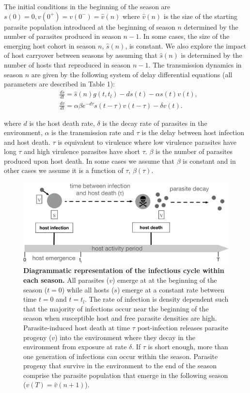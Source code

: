 \documentclass{article}
\begin{document}
The initial conditions in the beginning of the season are $s(0) = 0, v(0^+) = v(0^-) = \hat{v}(n)$ where $\hat{v}(n)$ is the size of the starting parasite population introduced at the beginning of season $n$ determined by the number of parasites produced in season $n-1$. In some cases, the size of the emerging host cohort in season $n$, $\hat{s}(n)$, is constant. We also explore the impact of host carryover between seasons by assuming that $\hat{s}(n)$ is determined by the number of hosts that reproduced in season $n-1$. The transmission dynamics in season $n$ are given by the following system of delay differential equations (all parameters are described in Table 1):
\begin{align*}
&\frac{ds}{dt} = \hat{s}(n)g(t,t_{l})-ds(t)- \alpha s(t)v(t),\tag{1a}\\
&\frac{dv}{dt} = \alpha \beta e^{-d\tau} s(t-\tau)v(t-\tau)-\delta v(t).\tag{1b}
\end{align*}

\noindent where $d$ is the host death rate, $\delta$ is the decay rate of parasites in the environment, $\alpha$ is the transmission rate and $\tau$ is the delay between host infection and host death. $\tau$ is equivalent to virulence where low virulence parasites have long $\tau$ and high virulence parasites have short $\tau$. $\beta$ is the number of parasites produced upon host death. In some cases we assume that $\beta$ is constant and in other cases we assume it is a function of $\tau$, $\beta(\tau)$. 
\begin{figure}[hb!]
  \centering
      \centering
      \includegraphics[width=\textwidth]{infection diagram bistability.pdf}%
 \hspace{2cm}
    \caption{\textbf{Diagrammatic representation of the infectious cycle within each season. } All parasites ($v$) emerge at at the beginning of the season ($t=0$) while all hosts ($s$) emerge at a constant rate between time $t=0$ and $t=t_{l}$.  The rate of infection is density dependent such that the majority of infections occur near the beginning of the season when susceptible host and free parasite densities are high. Parasite-induced host death at time $\tau$ post-infection releases parasite progeny ($v$) into the environment where they decay in the environment from exposure at rate $\delta$. If $\tau$ is short enough, more than one generation of infections can occur within the season. Parasite progeny that survive in the environment to the end of the season comprise the parasite population that emerge in the following season ($v(T) = \hat{v}(n+1)$).
    }
\end{figure}
\end{document}
